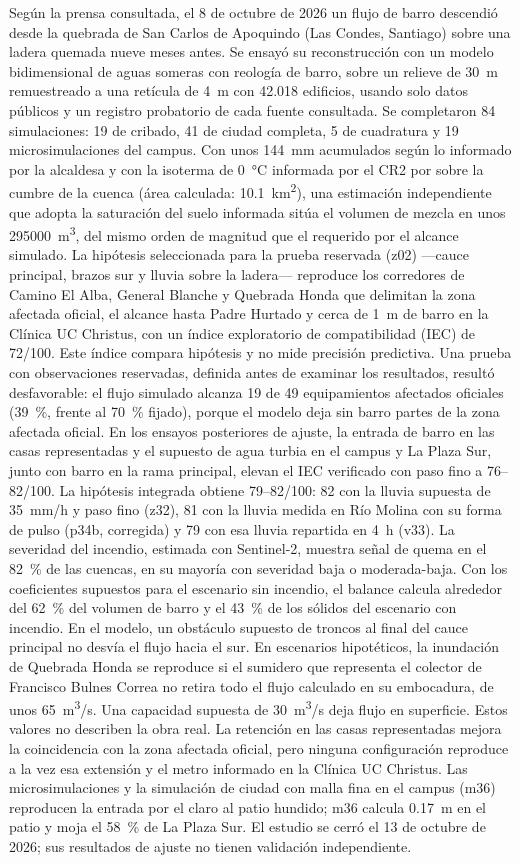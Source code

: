 Según la prensa consultada, el 8 de octubre de 2026 un flujo de barro descendió desde la quebrada de San Carlos de Apoquindo (Las Condes, Santiago) sobre una ladera quemada nueve meses antes. Se ensayó su reconstrucción con un modelo bidimensional de aguas someras con reología de barro, sobre un relieve de \SI{30}{m} remuestreado a una retícula de \SI{4}{m} con 42.018 edificios, usando solo datos públicos y un registro probatorio de cada fuente consultada. Se completaron 84 simulaciones: 19 de cribado, 41 de ciudad completa, 5 de cuadratura y 19 microsimulaciones del campus. Con unos \SI{144}{mm} acumulados según lo informado por la alcaldesa y con la isoterma de \SI{0}{\celsius} informada por el CR2 por sobre la cumbre de la cuenca (área calculada: \SI{10,1}{km^2}), una estimación independiente que adopta la saturación del suelo informada sitúa el volumen de mezcla en unos \SI{295000}{m^3}, del mismo orden de magnitud que el requerido por el alcance simulado. La hipótesis seleccionada para la prueba reservada (z02) ---cauce principal, brazos sur y lluvia sobre la ladera--- reproduce los corredores de Camino El Alba, General Blanche y Quebrada Honda que delimitan la zona afectada oficial, el alcance hasta Padre Hurtado y cerca de \SI{1}{m} de barro en la Clínica UC Christus, con un índice exploratorio de compatibilidad (IEC) de 72/100. Este índice compara hipótesis y no mide precisión predictiva. Una prueba con observaciones reservadas, definida antes de examinar los resultados, resultó desfavorable: el flujo simulado alcanza 19 de 49 equipamientos afectados oficiales (\SI{39}{\percent}, frente al \SI{70}{\percent} fijado), porque el modelo deja sin barro partes de la zona afectada oficial. En los ensayos posteriores de ajuste, la entrada de barro en las casas representadas y el supuesto de agua turbia en el campus y La Plaza Sur, junto con barro en la rama principal, elevan el IEC verificado con paso fino a 76--82/100. La hipótesis integrada obtiene 79--82/100: 82 con la lluvia supuesta de \SI{35}{mm/h} y paso fino (z32), 81 con la lluvia medida en Río Molina con su forma de pulso (p34b, corregida) y 79 con esa lluvia repartida en \SI{4}{h} (v33). La severidad del incendio, estimada con Sentinel-2, muestra señal de quema en el \SI{82}{\percent} de las cuencas, en su mayoría con severidad baja o moderada-baja. Con los coeficientes supuestos para el escenario sin incendio, el balance calcula alrededor del \SI{62}{\percent} del volumen de barro y el \SI{43}{\percent} de los sólidos del escenario con incendio. En el modelo, un obstáculo supuesto de troncos al final del cauce principal no desvía el flujo hacia el sur. En escenarios hipotéticos, la inundación de Quebrada Honda se reproduce si el sumidero que representa el colector de Francisco Bulnes Correa no retira todo el flujo calculado en su embocadura, de unos \SI{65}{m^3/s}. Una capacidad supuesta de \SI{30}{m^3/s} deja flujo en superficie. Estos valores no describen la obra real. La retención en las casas representadas mejora la coincidencia con la zona afectada oficial, pero ninguna configuración reproduce a la vez esa extensión y el metro informado en la Clínica UC Christus. Las microsimulaciones y la simulación de ciudad con malla fina en el campus (m36) reproducen la entrada por el claro al patio hundido; m36 calcula \SI{0,17}{m} en el patio y moja el \SI{58}{\percent} de La Plaza Sur. El estudio se cerró el 13 de octubre de 2026; sus resultados de ajuste no tienen validación independiente.
